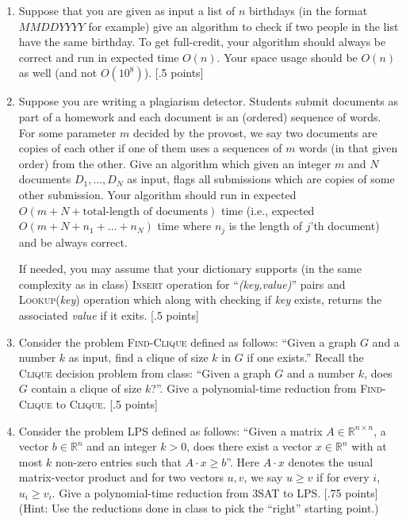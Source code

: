 \documentclass[11pt]{article}
\begin{document}
\begin{enumerate}
\item Suppose that you are given as input a list of $n$ birthdays (in the format $MMDDYYYY$ for example) give an algorithm to check if two people in the list have the same birthday. To get full-credit, your algorithm should always be correct and run in expected time $O(n)$. Your space usage should be $O(n)$ as well (and not $O(10^8)$). [.5 points]

\item Suppose you are writing a plagiarism detector. Students submit documents as part of a homework and each document is an (ordered) sequence of words. For some parameter $m$ decided by the provost, we say two documents are copies of each other if one of them uses a sequences of $m$ words (in that given order) from the other. Give an algorithm which given an integer $m$ and $N$ documents $D_1,\ldots,D_N$ as input, flags all submissions which are copies of some other submission. Your algorithm should run in expected $O(m + N + \text{total-length of documents})$ time (i.e., expected $O( m + N + n_1 + \ldots + n_N)$ time where $n_j$ is the length of $j$'th document) and be always correct. 

If needed, you may assume that your dictionary supports (in the same complexity as in class) \textsc{Insert} operation for ``\emph{(key,value)}'' pairs and \textsc{Lookup}(\emph{key}) operation which along with checking if \emph{key} exists, returns the associated \emph{value} if it exits. [.5 points]

\item Consider the problem \textsc{Find-Clique} defined as follows: ``Given a graph $G$ and a number $k$ as input, find a clique of size $k$ in $G$ if one exists.'' Recall the \textsc{Clique} decision problem from class: ``Given a graph $G$ and a number $k$, does $G$ contain a clique of size $k$?''. Give a polynomial-time reduction from \textsc{Find-Clique} to \textsc{Clique}. [.5 points]\\

\item Consider the problem \textsc{LPS} defined as follows: ``Given a matrix $A \in \mathbb{R}^{n \times n}$, a vector $b \in \mathbb{R}^n$ and an integer $k > 0$, does there exist a vector $x \in \mathbb{R}^n$ with at most $k$ non-zero entries such that $A \cdot x \geq b$''. Here $A \cdot x$ denotes the usual matrix-vector product and for two vectors $u,v$, we say $u \geq v$ if for every $i$, $u_i \geq v_i$. Give a polynomial-time reduction from \textsc{3SAT} to \textsc{LPS}. [.75 points]\\
(Hint: Use the reductions done in class to pick the ``right'' starting point.)


\end{enumerate}
\end{document}
